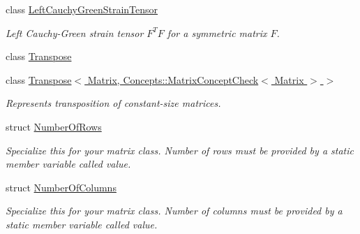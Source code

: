 \begin{DoxyCompactItemize}
class \hyperlink{classFunG_1_1LinearAlgebra_1_1LeftCauchyGreenStrainTensor}{Left\-Cauchy\-Green\-Strain\-Tensor}
\begin{DoxyCompactList}\small\item\em Left Cauchy-\/\-Green strain tensor $ F^T F $ for a symmetric matrix $ F $. \end{DoxyCompactList}\item 
class \hyperlink{classFunG_1_1LinearAlgebra_1_1Transpose}{Transpose}
\item 
class \hyperlink{classFunG_1_1LinearAlgebra_1_1Transpose_3_01Matrix_00_01Concepts_1_1MatrixConceptCheck_3_01Matrix_01_4_01_4}{Transpose$<$ Matrix, Concepts\-::\-Matrix\-Concept\-Check$<$ Matrix $>$ $>$}
\begin{DoxyCompactList}\small\item\em Represents transposition of constant-\/size matrices. \end{DoxyCompactList}\item 
struct \hyperlink{structFunG_1_1LinearAlgebra_1_1NumberOfRows}{Number\-Of\-Rows}
\begin{DoxyCompactList}\small\item\em Specialize this for your matrix class. Number of rows must be provided by a static member variable called value. \end{DoxyCompactList}\item 
struct \hyperlink{structFunG_1_1LinearAlgebra_1_1NumberOfColumns}{Number\-Of\-Columns}
\begin{DoxyCompactList}\small\item\em Specialize this for your matrix class. Number of columns must be provided by a static member variable called value. \end{DoxyCompactList}\end{DoxyCompactItemize}
